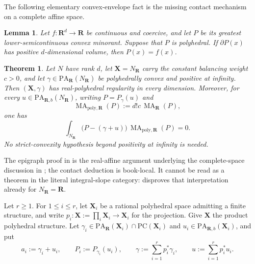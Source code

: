\documentclass[11pt,a4paper]{article}
\newtheorem{theorem}{Theorem}[section]
\newtheorem{lemma}[lemma]{Lemma}
\theoremstyle{definition}
\theoremstyle{remark}
\DeclareMathOperator{\MA}{MA}
\begin{document}
The following elementary convex-envelope fact is the missing contact
mechanism on a complete affine space.


\begin{lemma}\label{lem:frontier-polyhedral-affine-contact}
Let \(f:\mathbf R^d\to\mathbf R\) be continuous and coercive, and let
\(P\) be its greatest lower-semicontinuous convex minorant.  Suppose that
\(P\) is polyhedral.  If \(\partial P(x)\) has positive
\(d\)-dimensional volume, then \(P(x)=f(x)\).
\end{lemma}



\begin{theorem}\label{thm:frontier-polyhedral-affine-orthogonality}
Let \(N\) have rank \(d\), let
\(\mathbf X=N_{\mathbf R}\) carry the constant balancing weight
\(c>0\), and let
\(\gamma\in\mathrm{PA}_{\mathbf R}(N_{\mathbf R})\) be polyhedrally
convex and positive at infinity.  Then
\((\mathbf X,\gamma)\) has real-polyhedral regularity in every dimension.
Moreover, for every \(u\in\mathrm{PA}_{\mathbf R,b}(N_{\mathbf R})\),
writing \(P=P_\gamma(u)\) and
\[
             \MA_{\mathrm{poly},\mathbf R}(P)
             :=d!c\,\MA_{\mathbf R}(P),
\]
one has
\[
 \int_{N_{\mathbf R}}
 \bigl(P-(\gamma+u)\bigr)\,
 \MA_{\mathrm{poly},\mathbf R}(P)=0.
\]
No strict-convexity hypothesis beyond positivity at infinity is needed.
\end{theorem}



The epigraph proof in 
is the real-affine argument underlying the complete-space discussion in
\cite[Remark~6.6]{BMPS26}; the contact deduction is book-local.  It cannot
be read as a theorem in the literal integral-slope category:
 disproves
that interpretation already for \(N_{\mathbf R}=\mathbf R\).



Let $r\geq1$.  For $1\leq i\leq r$, let $\mathbf X_i$ be a rational
polyhedral space admitting a finite structure, and write
$p_i:\mathbf X:=\prod_i\mathbf X_i\to\mathbf X_i$ for the projection.  Give
$\mathbf X$ the product polyhedral structure.  Let
$\gamma_i\in\mathrm{PA}_{\mathbf R}(\mathbf X_i)\cap
\mathrm{PC}(\mathbf X_i)$ and
$u_i\in\mathrm{PA}_{\mathbf R,b}(\mathbf X_i)$, and put
\[
 a_i:=\gamma_i+u_i,
 \qquad
 P_i:=P_{\gamma_i}(u_i),
 \qquad
 \gamma:=\sum_{i=1}^r p_i^*\gamma_i,
 \qquad
 u:=\sum_{i=1}^r p_i^*u_i.
\]
\end{document}
